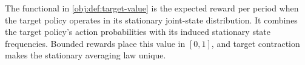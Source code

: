 The functional in \cref{obj:def:target-value} is the expected reward per period when the target policy operates in its stationary joint-state distribution. It combines the target policy's action probabilities with its induced stationary state frequencies. Bounded rewards place this value in \([0,1]\), and target contraction makes the stationary averaging law unique.
